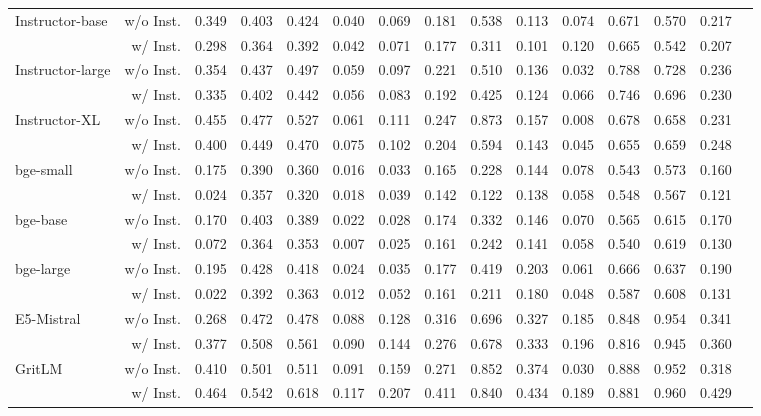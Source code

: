 \begin{table}[h]
{\begin{tabular}{lr|rcccccccccc|cc}
\midrule
\multirow{2}{*}{Instructor-base} &w/o Inst. &0.349 &0.403 &0.424 &0.040 &0.069 &0.181 &0.538 &0.113 &0.074 &0.671 &0.570 &0.217 \\
&w/ Inst. &0.298 &0.364 &0.392 &0.042 &0.071 &0.177 &0.311 &0.101 &0.120 &0.665 &0.542 &0.207 \\
\multirow{2}{*}{Instructor-large} &w/o Inst. &0.354 &0.437 &0.497 &0.059 &0.097 &0.221 &0.510 &0.136 &0.032 &0.788 &0.728 &0.236 \\
&w/ Inst. &0.335 &0.402 &0.442 &0.056 &0.083 &0.192 &0.425 &0.124 &0.066 &0.746 &0.696 &0.230 \\
\multirow{2}{*}{Instructor-XL} &w/o Inst. &0.455 &0.477 &0.527 &0.061 &0.111 &0.247 &0.873 &0.157 &0.008 &0.678 &0.658 &0.231 \\
&w/ Inst. &0.400 &0.449 &0.470 &0.075 &0.102 &0.204 &0.594 &0.143 &0.045 &0.655 &0.659 &0.248 \\
\multirow{2}{*}{bge-small} &w/o Inst. &0.175 &0.390 &0.360 &0.016 &0.033 &0.165 &0.228 &0.144 &0.078 &0.543 &0.573 &0.160 \\
&w/ Inst. &0.024 &0.357 &0.320 &0.018 &0.039 &0.142 &0.122 &0.138 &0.058 &0.548 &0.567 &0.121 \\
\multirow{2}{*}{bge-base} &w/o Inst. &0.170 &0.403 &0.389 &0.022 &0.028 &0.174 &0.332 &0.146 &0.070 &0.565 &0.615 &0.170 \\
&w/ Inst. &0.072 &0.364 &0.353 &0.007 &0.025 &0.161 &0.242 &0.141 &0.058 &0.540 &0.619 &0.130 \\
\multirow{2}{*}{bge-large} &w/o Inst. &0.195 &0.428 &0.418 &0.024 &0.035 &0.177 &0.419 &0.203 &0.061 &0.666 &0.637 &0.190 \\
&w/ Inst. &0.022 &0.392 &0.363 &0.012 &0.052 &0.161 &0.211 &0.180 &0.048 &0.587 &0.608 &0.131 \\
\multirow{2}{*}{E5-Mistral} &w/o Inst. &0.268 &0.472 &0.478 &0.088 &0.128 &0.316 &0.696 &0.327 &0.185 &0.848 &0.954 &0.341 \\
&w/ Inst. &0.377 &0.508 &0.561 &0.090 &0.144 &0.276 &0.678 &0.333 &0.196 &0.816 &0.945 &0.360 \\
\multirow{2}{*}{GritLM} &w/o Inst. &0.410 &0.501 &0.511 &0.091 &0.159 &0.271 &0.852 &0.374 &0.030 &0.888 &0.952 &0.318 \\
&w/ Inst. &0.464 &0.542 &0.618 &0.117 &0.207 &0.411 &0.840 &0.434 &0.189 &0.881 &0.960 &0.429 \\

\midrule[0.5pt]\midrule[0.5pt]


\end{tabular}}
\end{table}

